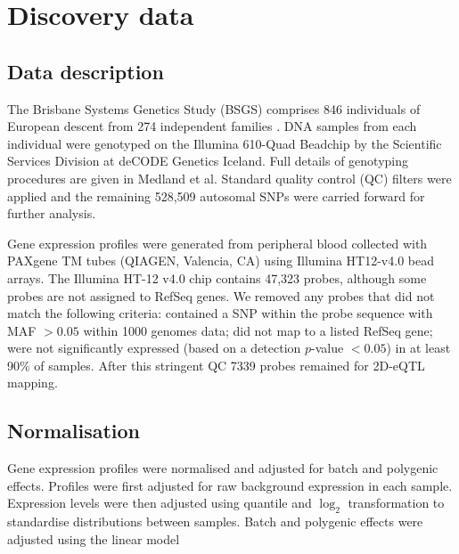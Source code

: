 \documentclass{article}
\begin{document}
\section{Discovery data}

\subsection{Data description}

The Brisbane Systems Genetics Study (BSGS) comprises 846 individuals of European descent from 274 independent families \cite{Powell2012}. DNA samples from each individual were genotyped on the Illumina 610-Quad Beadchip by the Scientific Services Division at deCODE Genetics Iceland. Full details of genotyping procedures are given in Medland et al. \cite{Medland2009} Standard quality control (QC) filters were applied and the remaining 528,509 autosomal SNPs were carried forward for further analysis. 

Gene expression profiles were generated from peripheral blood collected with PAXgene TM tubes (QIAGEN, Valencia, CA) using Illumina HT12-v4.0 bead arrays. The Illumina HT-12 v4.0 chip contains 47,323 probes, although some probes are not assigned to RefSeq genes. We removed any probes that did not match the following criteria: contained a SNP within the probe sequence with MAF $ > 0.05$ within 1000 genomes data; did not map to a listed RefSeq gene; were not significantly expressed (based on a detection $p$-value $< 0.05$) in at least 90\% of samples. After this stringent QC 7339 probes remained for 2D-eQTL mapping.


\subsection{Normalisation}

Gene expression profiles were normalised and adjusted for batch and polygenic effects. Profiles were first adjusted for raw background expression in each sample. Expression levels were then adjusted using quantile and $\log_2$ transformation to standardise distributions between samples. Batch and polygenic effects were adjusted using the linear model
\end{document}
